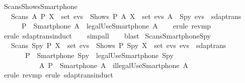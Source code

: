 \begin{isabellebody}
  \isamarkupfalse%
  \ Scans{\isacharunderscore}Shows{\isacharunderscore}Smartphone\ {\isacharcolon}\isanewline
  \ \ {\isachardoublequoteopen}{\isasymlbrakk}\ Scans\ A\ P\ X\ {\isasymin}\ set\ evs\ {\isasymor}\ Shows\ P\ A\ X\ {\isasymin}\ set\ evs{\isacharsemicolon}\ A\ {\isasymnoteq}\ Spy{\isacharsemicolon}\ evs\ {\isasymin}\ sdaptrans\ {\isasymrbrakk}\isanewline
  \ \ \ \ \ {\isasymLongrightarrow}\ {\isacharparenleft}P\ {\isacharequal}\ {\isacharparenleft}Smartphone\ A{\isacharparenright}\ {\isasymand}\ legalUse{\isacharparenleft}Smartphone\ A{\isacharparenright}{\isacharparenright}{\isachardoublequoteclose}\isanewline
  \isadelimproof
  \isanewline
  \ \ %
  \endisadelimproof
  \isatagproof
  \isamarkupfalse%
  \ {\isacharparenleft}erule\ rev{\isacharunderscore}mp{\isacharparenright}\isanewline
  \ \ \isamarkupfalse%
  \ {\isacharparenleft}erule\ sdaptrans{\isachardot}induct{\isacharparenright}\isanewline
  \ \ \isamarkupfalse%
  \ {\isacharparenleft}simp{\isacharunderscore}all{\isacharparenright}\isanewline
  \ \ \isamarkupfalse%
  \ {\isacharparenleft}blast{\isacharparenright}{\isacharplus}\isanewline
  \isamarkupfalse%
  \endisatagproof
  {\isafoldproof}%
  \isadelimproof
  \isanewline
  \endisadelimproof
  \isanewline
  \isanewline
  \isamarkupfalse%
  \ Scans{\isacharunderscore}Smartphone{\isacharunderscore}Spy\ {\isacharcolon}\isanewline
  \ \ {\isachardoublequoteopen}{\isasymlbrakk}\ Scans\ Spy\ P\ X\ {\isasymin}\ set\ evs\ {\isasymor}\ Shows\ P\ Spy\ X\ {\isasymin}\ set\ evs{\isacharsemicolon}\ evs\ {\isasymin}\ sdaptrans\ {\isasymrbrakk}\isanewline
  \ \ \ \ \ \ {\isasymLongrightarrow}\ {\isacharparenleft}P\ {\isacharequal}\ {\isacharparenleft}Smartphone\ Spy{\isacharparenright}{\isacharparenright}\ {\isasymand}\ {\isacharparenleft}legalUse{\isacharparenleft}Smartphone\ Spy{\isacharparenright}{\isacharparenright}\ {\isasymor}\isanewline
  \ \ \ \ \ \ \ \ \ \ {\isacharparenleft}{\isasymexists}\ A{\isachardot}\ P\ {\isacharequal}\ {\isacharparenleft}Smartphone\ A{\isacharparenright}\ {\isasymand}\ illegalUse{\isacharparenleft}Smartphone\ A{\isacharparenright}{\isacharparenright}{\isachardoublequoteclose}\isanewline
  \isadelimproof
  \isanewline
  \ \ %
  \endisadelimproof
  \isatagproof
  \isamarkupfalse%
  \ {\isacharparenleft}erule\ rev{\isacharunderscore}mp{\isacharcomma}\ erule\ sdaptrans{\isachardot}induct{\isacharparenright}\isanewline
  \ \ \isamarkupfalse%

\end{isabellebody}
